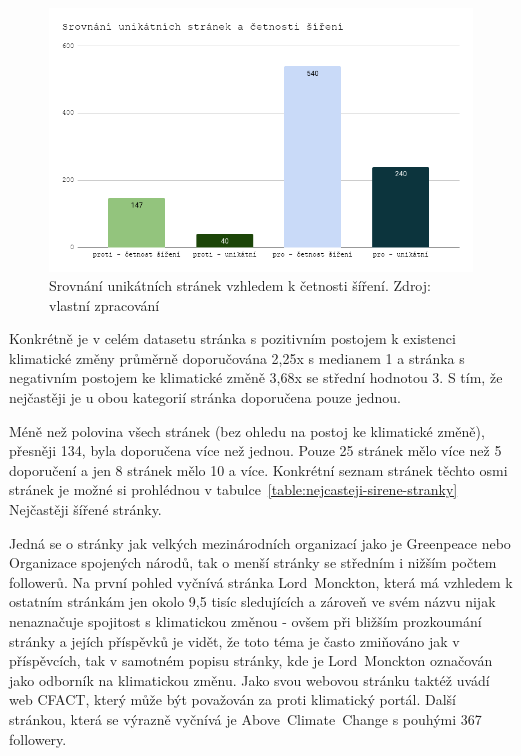     \begin{figure}[H] 
        \includegraphics[width=14cm]{obrazky/Srovnání unikátních stránek a četnosti šíření.png}
        \centering
        \caption[Srovnání unikátních stránek vzhledem k četnosti šíření]{Srovnání unikátních stránek vzhledem k četnosti šíření. Zdroj: vlastní zpracování}
        \label{fig:fb-klima-stranky-sireni}
    \end{figure}

    Konkrétně je v celém datasetu stránka s pozitivním postojem k existenci klimatické změny průměrně doporučována 2,25x s medianem 1 a stránka s negativním postojem ke klimatické změně 3,68x se střední hodnotou 3. S tím, že nejčastěji je u obou kategorií stránka doporučena pouze jednou. 
    
    Méně než polovina všech stránek (bez ohledu na postoj ke klimatické změně), přesněji 134, byla doporučena více než jednou. Pouze 25 stránek mělo více než 5 doporučení a jen 8 stránek mělo 10 a více. Konkrétní seznam stránek těchto osmi stránek je možné si prohlédnou v tabulce~\ref{table:nejcasteji-sirene-stranky} Nejčastěji šířené stránky. 
    
    Jedná se o stránky jak velkých mezinárodních organizací jako je Greenpeace nebo Organizace spojených národů, tak o menší stránky se středním i nižším počtem followerů. Na první pohled vyčnívá stránka Lord~Monckton, která má vzhledem k ostatním stránkám jen okolo 9,5 tisíc sledujících a zároveň ve svém názvu nijak nenaznačuje spojitost s klimatickou změnou - ovšem při bližším prozkoumání stránky a jejích příspěvků je vidět, že toto téma je často zmiňováno jak v příspěvcích, tak v samotném popisu stránky, kde je Lord~Monckton označován jako odborník na klimatickou změnu. Jako svou webovou stránku taktéž uvádí web CFACT, který může být považován za proti klimatický portál. Další stránkou, která se výrazně vyčnívá je Above~Climate~Change s pouhými 367 followery. 
    
